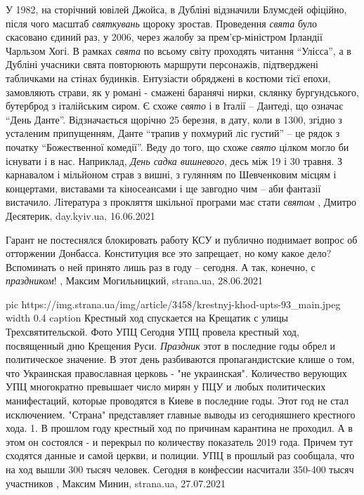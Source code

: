 У 1982, на сторічний ювілей Джойса, в Дубліні відзначили Блумсдей офіційно,
після чого масштаб \emph{святкувань} щороку зростав. Проведення \emph{свята} було скасовано
єдиний раз, у 2006, через жалобу за прем'єр-міністром Ірландії Чарльзом Хогі.
В рамках \emph{свята} по всьому світу проходять читання \enquote{Улісса}, а в Дубліні учасники
свята повторюють маршрути персонажів, підтверджені табличками на стінах
будинків. Ентузіасти обряджені в костюми тієї епохи, замовляють страви, як у
романі - смажені баранячі нирки, склянку бургундського, бутерброд з італійським
сиром.  Є схоже \emph{свято} і в Італії – Дантеді, що означає \enquote{День Данте}.
Відзначається щорічно 25 березня, в дату, коли в 1300, згідно з усталеним
припущенням, Данте \enquote{трапив у похмурий ліс густий} – це рядок з початку
\enquote{Божественної комедії}.  Веду до того, що схоже \emph{свято} цілком могло би існувати
і в нас. Наприклад, \emph{День садка вишневого}, десь між 19 і 30 травня. З карнавалом
і мільйоном страв з вишні, з гулянням по Шевченковим місцям і концертами,
виставами та кіносеансами і ще завгодно чим – аби фантазії вистачило.
Література з прокляття шкільної програми має стати \emph{святом}
, 
Дмитро Десятерик, day.kyiv.ua, 16.06.2021

Гарант не постеснялся блокировать работу КСУ и публично поднимает вопрос об
отторжении Донбасса. Конституция все это запрещает, но кому какое дело?
Вспоминать о ней принято лишь раз в году – сегодня. А так, конечно, с
\emph{праздником}!
, 
Максим Могильницкий, strana.ua, 28.06.2021

\ifcmt
  pic https://img.strana.ua/img/article/3458/krestnyj-khod-upts-93_main.jpeg
  width 0.4
	caption Крестный ход спускается на Крещатик с улицы Трехсвятительской. Фото УПЦ 
\fi
Сегодня УПЦ провела крестный ход, посвященный дню Крещения Руси.
\emph{Праздник} этот в последние годы обрел и политическое значение.  В этот
день разбиваются пропагандистские клише о том, что Украинская православная
церковь - "не украинская". Количество верующих УПЦ многократно превышает число
мирян у ПЦУ и любых политических манифестаций, которые проводятся в Киеве в
последние годы.  Этот год не стал исключением. "Страна" представляет главные
выводы из сегодняшнего крестного хода.  1. В прошлом году крестный ход по
причинам карантина не проходил. А в этом он состоялся - и перекрыл по
количеству показатель 2019 года.  Причем тут сходятся данные и самой церкви, и
полиции. УПЦ в прошлый раз сообщала, что на ход вышли 300 тысяч человек.
Сегодня в конфессии насчитали 350-400 тысяч участников
, 
Максим Минин, strana.ua, 27.07.2021

